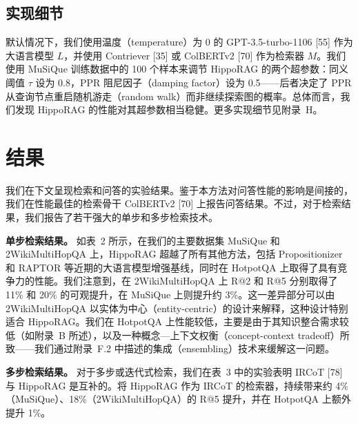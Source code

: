 \documentclass[11pt,UTF8,fontset=fandol]{ctexart}
\begin{document}
\subsection{实现细节}

默认情况下，我们使用温度（temperature）为 0 的 GPT-3.5-turbo-1106 [55] 作为大语言模型 $L$，并使用 Contriever [35] 或 ColBERTv2 [70] 作为检索器 $M$。我们使用 MuSiQue 训练数据中的 100 个样本来调节 HippoRAG 的两个超参数：同义阈值 $\tau$ 设为 0.8，PPR 阻尼因子（damping factor）设为 0.5——后者决定了 PPR 从查询节点重启随机游走（random walk）而非继续探索图的概率。总体而言，我们发现 HippoRAG 的性能对其超参数相当稳健。更多实现细节见附录~H。

\section{结果}

我们在下文呈现检索和问答的实验结果。鉴于本方法对问答性能的影响是间接的，我们在性能最佳的检索骨干 ColBERTv2 [70] 上报告问答结果。不过，对于检索结果，我们报告了若干强大的单步和多步检索技术。

\textbf{单步检索结果。} 如表~2 所示，在我们的主要数据集 MuSiQue 和 2WikiMultiHopQA 上，HippoRAG 超越了所有其他方法，包括 Propositionizer 和 RAPTOR 等近期的大语言模型增强基线，同时在 HotpotQA 上取得了具有竞争力的性能。我们注意到，在 2WikiMultiHopQA 上 R@2 和 R@5 分别取得了 11\% 和 20\% 的可观提升，在 MuSiQue 上则提升约 3\%。这一差异部分可以由 2WikiMultiHopQA 以实体为中心（entity-centric）的设计来解释，这种设计特别适合 HippoRAG。我们在 HotpotQA 上性能较低，主要是由于其知识整合需求较低（如附录~B 所述），以及一种概念—上下文权衡（concept-context tradeoff）所致——我们通过附录~F.2 中描述的集成（ensembling）技术来缓解这一问题。

\textbf{多步检索结果。} 对于多步或迭代式检索，我们在表~3 中的实验表明 IRCoT [78] 与 HippoRAG 是互补的。将 HippoRAG 作为 IRCoT 的检索器，持续带来约 4\%（MuSiQue）、18\%（2WikiMultiHopQA）的 R@5 提升，并在 HotpotQA 上额外提升 1\%。
\end{document}
